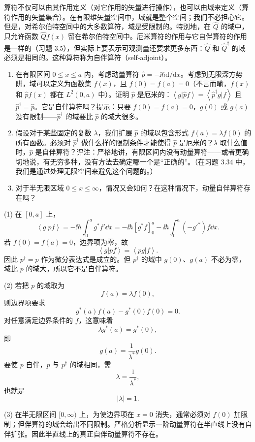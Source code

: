 \begin{question}
算符不仅可以由其作用定义（对它作用的矢量进行操作），也可以由域来定义（算符作用的矢量集合）。在有限维矢量空间中，域就是整个空间；我们不必担心它。但是，对希尔伯特空间中的大多数算符，域是受限制的。特别地，在 $\hat Q$ 的域中，只允许函数 $\hat Q f(x)$ 留在希尔伯特空间中。厄米算符的作用与它自伴算符的作用是一样的（习题 3.5），但实际上要表示可观测量还要求更多东西：$\hat Q$ 和 $\hat Q^\dagger$ 的域必须是相同的。这种算符称为自伴算符（self-adjoint）。
\begin{enumerate}
\item 在有限区间 $0\leq x\leq a$ 内，考虑动量算符 $\hat p=-\ii\hbar\mathrm d/\mathrm dx$。考虑到无限深方势阱，域可以定义为函数集 $f(x)$，且 $f(0)=f(a)=0$（不言而喻，$f(x)$ 和 $\hat p f(x)$ 都在 $L^2(0,a)$ 中）。证明 $\hat p$ 是厄米的：$\left\langle g|\hat p f \right\rangle=\left\langle \hat p^\dagger g|f \right\rangle$ 且 $\hat p^\dagger=\hat p$。它是自伴算符吗？提示：只要 $f(0)=f(a)=0$，$g(0)$ 或 $g(a)$ 没有限制——$\hat p^\dagger$ 的域要比 $\hat p$ 的域大很多。
\item 假设对于某些固定的复数 $\lambda$，我们扩展 $\hat p$ 的域以包含形式 $f(a)=\lambda f(0)$ 的所有函数。必须对 $\hat p^\dagger$ 做什么样的限制条件才能使得 $\hat p$ 是厄米的？$\lambda$ 取什么值时，$\hat p$ 是自伴算符？评注：严格地讲，有限区间内没有动量算符——或者更确切地说，有无穷多种，没有方法去确定哪一个是“正确的”。（在习题 3.34 中，我们是通过处理无限空间来避免这个问题的。）
\item 对于半无限区域 $0\leq x\leq\infty$，情况又会如何？在这种情况下，动量自伴算符存在吗？
\end{enumerate}
\end{question}
\begin{solution}
(1) 在 $[0,a]$ 上，
\[
\left\langle g|pf \right\rangle=-\ii\hbar\int_0^ag^*f'\dd x
=-\ii\hbar[g^*f]_0^a-\ii\hbar\int_0^a(-g'^*)f\dd x.
\]
若 $f(0)=f(a)=0$，边界项为零，故
\[
\left\langle g|pf \right\rangle=\left\langle pg|f \right\rangle.
\]
因此 $p^\dagger=p$ 作为微分表达式是成立的。但 $p^\dagger$ 的域中 $g(0)$、$g(a)$ 不必为零，域比 $p$ 的域大，所以它不是自伴算符。

(2) 若把 $p$ 的域取为
\[
f(a)=\lambda f(0),
\]
则边界项要求
\[
g^*(a)f(a)-g^*(0)f(0)=0.
\]
对任意满足边界条件的 $f$，这意味着
\[
\lambda g^*(a)=g^*(0),
\]
即
\[
\boxed{g(a)=\frac{1}{\lambda^*}g(0).}
\]
要使 $p$ 自伴，$p$ 与 $p^\dagger$ 的域相同，需
\[
\lambda=\frac1{\lambda^*},
\]
也就是
\[
\boxed{|\lambda|=1.}
\]

(3) 在半无限区间 $[0,\infty)$ 上，为使边界项在 $x=0$ 消失，通常必须对 $f(0)$ 加限制；但伴算符的域会给出不同限制。严格分析显示一阶动量算符在半直线上没有自伴扩张。因此半直线上的真正自伴动量算符不存在。
\end{solution}

